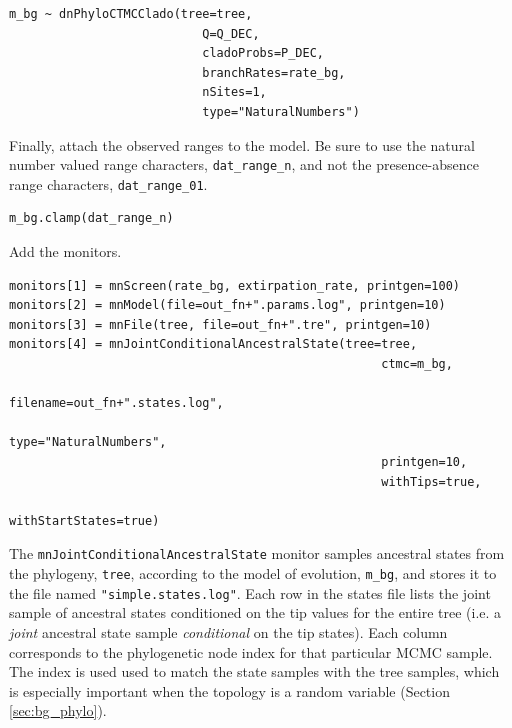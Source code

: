 \begin{snugshade}
\begin{lstlisting}
m_bg ~ dnPhyloCTMCClado(tree=tree,
                           Q=Q_DEC,
                           cladoProbs=P_DEC,
                           branchRates=rate_bg,
                           nSites=1,
                           type="NaturalNumbers")
\end{lstlisting}
\end{snugshade}

Finally, attach the observed ranges to the model.
Be sure to use the natural number valued range characters, {\tt dat\_range\_n}, and not the presence-absence range characters, {\tt dat\_range\_01}.

\begin{snugshade}
\begin{lstlisting}
m_bg.clamp(dat_range_n)
\end{lstlisting}
\end{snugshade}

Add the monitors.

\begin{snugshade}
\begin{lstlisting}
monitors[1] = mnScreen(rate_bg, extirpation_rate, printgen=100)
monitors[2] = mnModel(file=out_fn+".params.log", printgen=10)
monitors[3] = mnFile(tree, file=out_fn+".tre", printgen=10)
monitors[4] = mnJointConditionalAncestralState(tree=tree,
                                                    ctmc=m_bg,
                                                    filename=out_fn+".states.log",
                                                    type="NaturalNumbers",
                                                    printgen=10,
                                                    withTips=true,
                                                    withStartStates=true)
\end{lstlisting}
\end{snugshade}

The {\tt mnJointConditionalAncestralState} monitor samples ancestral states from the phylogeny, {\tt tree}, according to the model of evolution, {\tt m\_bg}, and stores it to the file named {\tt "simple.states.log"}.
Each row in the states file lists the joint sample of ancestral states conditioned on the tip values for the entire tree (i.e. a {\it joint} ancestral state sample {\it conditional} on the tip states).
Each column corresponds to the phylogenetic node index for that particular MCMC sample.
The index is used used to match the state samples with the tree samples, which is especially important when the topology is a random variable (Section \ref{sec:bg_phylo}).

